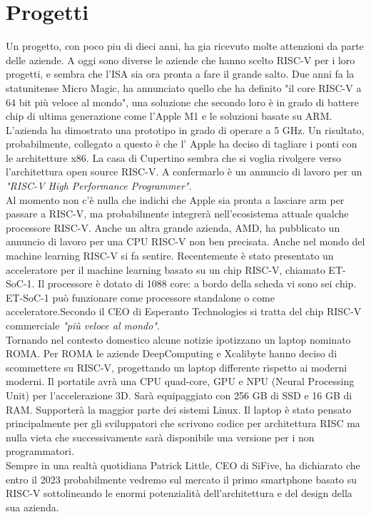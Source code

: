 \documentclass[12pt,a4paper]{report}
\begin{document}
\chapter{Progetti}
Un progetto, con poco piu di dieci anni, ha gia ricevuto molte attenzioni da parte delle aziende. A oggi sono diverse le aziende che hanno scelto RISC-V per i loro progetti, e sembra che l'ISA sia ora pronta a fare il grande salto.  Due anni fa la statunitense Micro Magic, ha annunciato quello che ha definito "il core RISC-V a 64 bit più veloce al mondo", una soluzione che secondo loro è in grado di battere chip di ultima generazione come l'Apple M1 e le soluzioni basate su ARM.  L'azienda ha dimostrato una prototipo in grado di operare a 5 GHz. Un risultato, probabilmente, collegato a questo è che l' Apple ha deciso di tagliare i ponti con le architetture x86. La casa di Cupertino sembra che si voglia rivolgere verso l'architettura open source RISC-V. A confermarlo è un annuncio di lavoro per un \textit{"RISC-V High Performance Programmer"}.\\
Al momento non c'è nulla che indichi che  Apple sia pronta a lasciare arm per passare a RISC-V, ma probabilmente integrerà nell'ecosistema attuale qualche processore RISC-V. Anche un altra grande azienda, AMD, ha pubblicato un annuncio di lavoro per una CPU RISC-V non ben precisata. Anche nel mondo del machine learning RISC-V si fa sentire.  Recentemente è stato presentato un acceleratore per il machine learning basato su un chip RISC-V, chiamato ET-SoC-1. Il processore è  dotato di 1088 core: a bordo della scheda vi sono sei chip. ET-SoC-1 può funzionare come processore standalone o come acceleratore.Secondo il CEO  di Esperanto Technologies si tratta del chip RISC-V commerciale \textit{ "più veloce al mondo"}. \\
Tornando nel contesto domestico alcune notizie ipotizzano un laptop nominato ROMA.
Per ROMA le aziende DeepComputing e Xcalibyte hanno deciso di scommettere su  RISC-V, progettando un laptop differente rispetto ai moderni moderni. Il portatile avrà una CPU quad-core, GPU e NPU (Neural Processing Unit) per l’accelerazione 3D. Sarà equipaggiato con 256 GB di SSD e 16 GB di RAM. Supporterà la maggior parte dei sistemi Linux. Il laptop è stato pensato principalmente per gli sviluppatori che scrivono codice per architettura RISC ma nulla vieta che successivamente sarà disponibile una versione per i non programmatori.\\
Sempre in una realtà quotidiana Patrick Little, CEO di SiFive, ha dichiarato che entro il 2023 probabilmente vedremo sul mercato il primo smartphone basato su RISC-V sottolineando le enormi potenzialità dell'architettura e del design della sua azienda.
\end{document}
